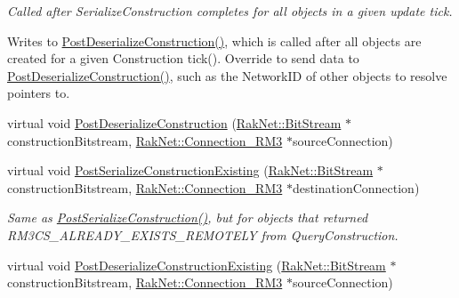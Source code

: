 \begin{DoxyCompactItemize}
\begin{DoxyCompactList}\small\item\em Called after Serialize\-Construction completes for all objects in a given update tick.\par
 Writes to \hyperlink{class_rak_net_1_1_replica3_a7d612c095fa5d81c1c6fabaa1a0f2501}{Post\-Deserialize\-Construction()}, which is called after all objects are created for a given Construction tick(). Override to send data to \hyperlink{class_rak_net_1_1_replica3_a7d612c095fa5d81c1c6fabaa1a0f2501}{Post\-Deserialize\-Construction()}, such as the Network\-I\-D of other objects to resolve pointers to. \end{DoxyCompactList}\item 
virtual void \hyperlink{class_rak_net_1_1_replica3_a7d612c095fa5d81c1c6fabaa1a0f2501}{Post\-Deserialize\-Construction} (\hyperlink{class_rak_net_1_1_bit_stream}{Rak\-Net\-::\-Bit\-Stream} $\ast$construction\-Bitstream, \hyperlink{class_rak_net_1_1_connection___r_m3}{Rak\-Net\-::\-Connection\-\_\-\-R\-M3} $\ast$source\-Connection)
\item 
\hypertarget{class_rak_net_1_1_replica3_a2f9257e74d9ecedb92700473dcea9bb4}{virtual void \hyperlink{class_rak_net_1_1_replica3_a2f9257e74d9ecedb92700473dcea9bb4}{Post\-Serialize\-Construction\-Existing} (\hyperlink{class_rak_net_1_1_bit_stream}{Rak\-Net\-::\-Bit\-Stream} $\ast$construction\-Bitstream, \hyperlink{class_rak_net_1_1_connection___r_m3}{Rak\-Net\-::\-Connection\-\_\-\-R\-M3} $\ast$destination\-Connection)}\label{class_rak_net_1_1_replica3_a2f9257e74d9ecedb92700473dcea9bb4}

\begin{DoxyCompactList}\small\item\em Same as \hyperlink{class_rak_net_1_1_replica3_a1b2a1d043e575f738e204d1d3a41c5a5}{Post\-Serialize\-Construction()}, but for objects that returned R\-M3\-C\-S\-\_\-\-A\-L\-R\-E\-A\-D\-Y\-\_\-\-E\-X\-I\-S\-T\-S\-\_\-\-R\-E\-M\-O\-T\-E\-L\-Y from Query\-Construction. \end{DoxyCompactList}\item 
\hypertarget{class_rak_net_1_1_replica3_a15bdad205bb8e73c686b526b104fc1e6}{virtual void \hyperlink{class_rak_net_1_1_replica3_a15bdad205bb8e73c686b526b104fc1e6}{Post\-Deserialize\-Construction\-Existing} (\hyperlink{class_rak_net_1_1_bit_stream}{Rak\-Net\-::\-Bit\-Stream} $\ast$construction\-Bitstream, \hyperlink{class_rak_net_1_1_connection___r_m3}{Rak\-Net\-::\-Connection\-\_\-\-R\-M3} $\ast$source\-Connection)}\label{class_rak_net_1_1_replica3_a15bdad205bb8e73c686b526b104fc1e6}


\end{DoxyCompactItemize}
